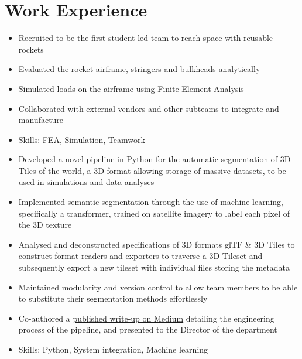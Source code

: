 \documentclass{cv}
\begin{document}
\section{Work Experience}
\begin{subsections}
    \subtitle{Karman Space Programme}
    \begin{itemize}
        \item Recruited to be the first student-led team to reach space with reusable rockets
        \item Evaluated the rocket airframe, stringers and bulkheads analytically
        \item Simulated loads on the airframe using Finite Element Analysis
        \item Collaborated with external vendors and other subteams to integrate and manufacture
        \item Skills: FEA, Simulation, Teamwork
    \end{itemize}

    \subtitle{Guided Systems, DSO National Laboratories}

    \subtitle{Simulation \& Training Systems Hub, Defence Science and Technology Agency}
    \begin{itemize}
        \item Developed a \href{https://github.com/thedylone/tile-segmentation-pipeline}{novel pipeline in Python} for the automatic segmentation of 3D Tiles of the world, a 3D format allowing storage of massive datasets, to be used in simulations and data analyses
        \item Implemented semantic segmentation through the use of machine learning, specifically a transformer, trained on satellite imagery to label each pixel of the 3D texture
        \item Analysed and deconstructed specifications of 3D formats glTF \& 3D Tiles to construct format readers and exporters to traverse a 3D Tileset and subsequently export a new tileset with individual files storing the metadata
        \item Maintained modularity and version control to allow team members to be able to substitute their segmentation methods effortlessly
        \item Co-authored a \href{https://medium.com/d-classified/segmentation-pipeline-for-3d-tiles-1303fcb5e6be}{published write-up on Medium} detailing the engineering process of the pipeline, and presented to the Director of the department
        \item Skills: Python, System integration, Machine learning
    \end{itemize}


\end{subsections}
\end{document}
